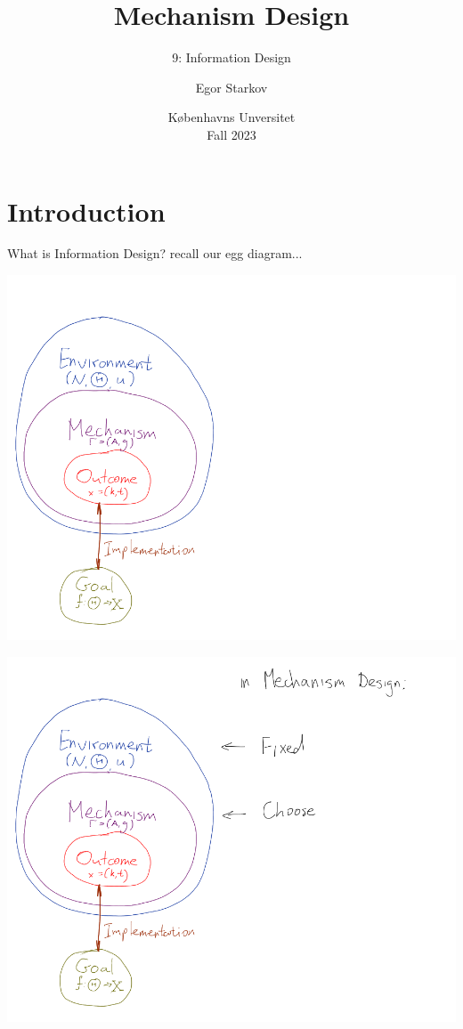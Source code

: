 \documentclass[english,10pt
,aspectratio=169
]{beamer}
\title{Mechanism Design}
\subtitle{9: Information Design}
\author{Egor Starkov}
\date{K{\o}benhavns Unversitet \\
	Fall 2023}
\begin{document}
	\frame[plain]{\titlepage}


\section{Introduction}


\begin{frame}{What is Information Design?}
	recall our egg diagram...
\end{frame}


\begin{frame}
	\centering
	\includegraphics[scale=0.32]{pics/M7/MD_vs_ID_1}
\end{frame}


\begin{frame}
	\centering
	\includegraphics[scale=0.32]{pics/M7/MD_vs_ID_2}
\end{frame}
\end{document}
